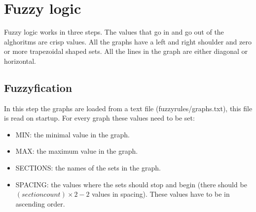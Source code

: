 \documentclass[10pt]{extarticle} %
\begin{document}
    \newpage
   \section {Fuzzy logic}
   Fuzzy logic works in three steps. The values that go in and go out of the alghoritms are crisp values. All the graphs have a left and right shoulder and zero or more trapezoidal shaped sets. All the lines in the graph are either diagonal or horizontal.
   \subsection{Fuzzyfication}
   In this step the graphs are loaded from a text file (fuzzyrules/graphs.txt), this file is read on startup. For every graph these values need to be set: 
   \begin{itemize}
   \item MIN: the minimal value in the graph.
   \item MAX: the maximum value in the graph.
   \item SECTIONS: the names of the sets in the graph.
   \item SPACING: the values where the sets should stop and begin (there should be \( (section count) \times 2 - 2\) values in spacing). These values have to be in ascending order.
   \end{itemize}
\end{document}
